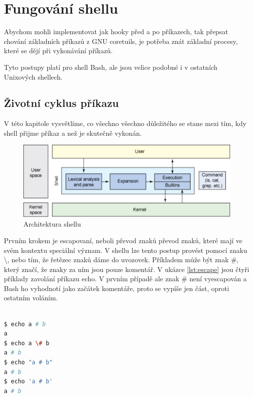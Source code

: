 \documentclass[thesis=M,czech]{FITthesis}[2012/06/26]
\begin{document}
%
%
%
\section{Fungování shellu}

Abychom mohli implementovat jak hooky před a po příkazech, tak přepsat chování základních příkazů z GNU coretuils, je potřeba znát základní procesy, které se dějí při vykonávání příkazů.

Tyto postupy platí pro shell Bash, ale jsou velice podobné i v ostatních Unixových shellech.



%
%
%
\subsection{Životní cyklus příkazu}

V této kapitole vysvětlíme, co všechno všechno důležitého se stane mezi tím, kdy shell přijme příkaz a než je skutečně vykonán. 

\begin{figure}[htb]\centering
	\includegraphics[width=\textwidth]{./images/shell_arch2}
	\caption{Architektura shellu}
	\label{fig:shell_arch}
\end{figure}


Prvním krokem je escapovaní, neboli převod znaků převod znaků, které mají ve svém kontextu speciální význam. V shellu lze tento postup provést pomocí znaku \textbackslash, nebo tím, že řetězec znaků dáme do uvozovek. Příkladem může být znak \#, který značí, že znaky za ním jsou pouze komentář. V ukázce \ref{lst:escape} jsou čtyři příklady zavolání příkazu echo. V prvním případě ale znak \# není vyescapován a Bash ho vyhodnotí jako začátek komentáře, proto se vypíše jen část, oproti ostatním voláním.


\begin{lstlisting}[language=bash, caption={Escapovaní v shellu}, label={lst:escape}]

$ echo a # b
a
$ echo a \# b
a # b
$ echo "a # b"
a # b
$ echo 'a # b'
a # b

\end{lstlisting}
\end{document}
